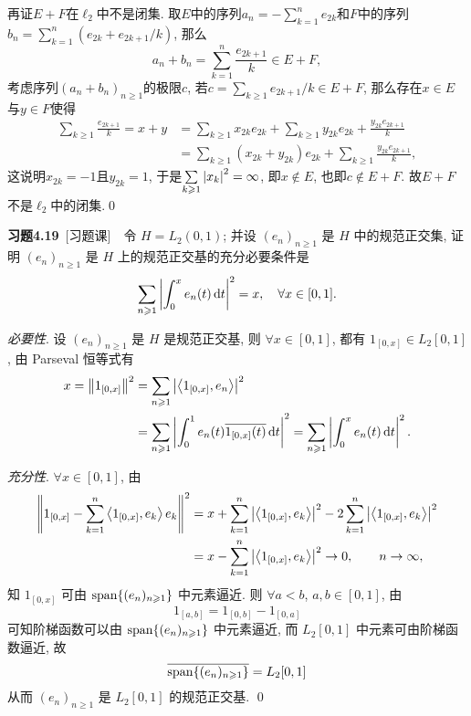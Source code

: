 \begin{Proof}
    再证$ E+F $在$ \ell_2 $中不是闭集. 取$ E $中的序列$ a_n=-\sum\limits_{k=1}^ne_{2k} $和$ F $中的序列$ b_n=\sum\limits_{k=1}^n(e_{2k}+e_{2k+1}/k) $, 那么
    \[
    a_n+b_n=\sum_{k=1}^n\frac{e_{2k+1}}{k}\in E+F,
    \]
    考虑序列$ (a_n+b_n)_{n\geqslant 1} $的极限$ c $, 若$ c=\sum\limits_{k\geqslant 1}e_{2k+1}/k\in E+F $, 那么存在$ x\in E $与$ y\in F $使得
    \[
    \begin{aligned}
    \sum_{k\geqslant 1}\frac{e_{2k+1}}{k}=x+y&=\sum_{k\geqslant 1}x_{2k}e_{2k}+\sum_{k\geqslant 1}y_{2k}e_{2k}+\frac{y_{2k}e_{2k+1}}{k}\\
    &=\sum_{k\geqslant 1}(x_{2k}+y_{2k})e_{2k}+\sum_{k\geqslant 1}\frac{y_{2k}e_{2k+1}}{k},
    \end{aligned}
    \]
    这说明$ x_{2k}=-1 $且$ y_{2k}=1 $, 于是$ \sum\limits_{k\geqslant 1}\left| x_k \right| ^2=\infty $, 即$ x\notin E $, 也即$ c\notin E+F $. 故$ E+F $不是$ \ell_2 $中的闭集.\qed
    \end{Proof}

    \textbf{习题4.19}\ [习题课]\ \ 令 $ H=L_{2}(0, 1) $; 并设 $ (e_{n})_{n\geqslant1} $ 是 $ H $ 中的规范正交集, 证明 $ (e_{n})_{n\geqslant1} $ 是 $ H $ 上的规范正交基的充分必要条件是
    \[
        \sum_{n\geqslant1}\left| \int_{0}^{x}e_{n}(t)\,\mathrm{d} t \right| ^{2} = x, \quad \forall x\in[0, 1].
    \]
    \begin{Proof}
        \textsl{必要性}. 设 $ (e_{n})_{n\geqslant1} $ 是 $ H $ 是规范正交基, 则 $ \forall x\in[0, 1] $, 都有 $ 1_{[0, x]}\in L_{2}[0, 1] $, 由 Parseval 恒等式有
        \[
            \begin{aligned}
                x = \left\| 1_{[0, x]} \right\|^{2} & =\sum_{n\geqslant1}\left| \left\langle 1_{[0, x]}, e_{n} \right\rangle \right| ^{2}\\
                & =\sum_{n\geqslant1}\left| \int_{0}^{1}e_{n}(t)\overline{1_{[0, x]}(t)}\,\mathrm{d} t \right| ^{2}=\sum_{n\geqslant1}\left| \int_{0}^{x}e_{n}(t)\,\mathrm{d} t \right| ^{2}.
            \end{aligned}
        \]

        \textsl{充分性}. $ \forall x\in[0, 1] $, 由
        \[
            \begin{aligned}
                \left\| 1_{[0, x]}-\sum_{k=1}^{n}\left\langle 1_{[0, x]}, e_{k} \right\rangle e_{k} \right\|^{2} & = x+\sum_{k=1}^{n}\left| \left\langle 1_{[0, x]}, e_{k} \right\rangle \right| ^{2}-2\sum_{k=1}^{n}\left| \left\langle 1_{[0, x]}, e_{k} \right\rangle \right| ^{2} \\
            & = x-\sum_{k=1}^{n}\left| \left\langle 1_{[0, x]}, e_{k} \right\rangle \right| ^{2}\to 0,\qquad n\to\infty,
            \end{aligned}
        \]
        知 $ 1_{[0, x]} $ 可由 $ \operatorname{span}\{ (e_{n})_{n\geqslant1} \} $ 中元素逼近. 则 $ \forall a<b $, $ a, b\in[0, 1] $, 由
        \[
            1_{[a, b]} = 1_{[0, b]}-1_{[0, a]}
        \]
        可知阶梯函数可以由 $ \operatorname{span}\{ (e_{n})_{n\geqslant1} \} $ 中元素逼近, 而 $ L_{2}[0, 1] $ 中元素可由阶梯函数逼近, 故
        \[
            \overline{\operatorname{span}\{ (e_{n})_{n\geqslant1} \}}=L_{2}[0, 1]
        \]
        从而 $ (e_{n})_{n\geqslant1} $ 是 $ L_{2}[0, 1] $ 的规范正交基. \qed
    \end{Proof}    

